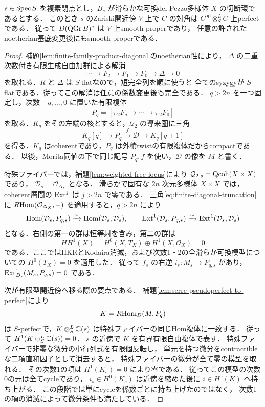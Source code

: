 \begin{theorem}[有限族のsmoothnessの有限開近傍]
\label{thm:finite-family-smooth-open}
$s\in\operatorname{Spec} S$ を複素閉点とし，$B_s$ が滑らかな可換del Pezzo多様体
$X$ の切断環であるとする．
このとき $s$ のZariski開近傍 $V$ 上で $C$ の対角は
$C^{\mathrm{op}}\otimes_S^LC$ 上perfectである．
従って $D(\operatorname{QGr} B)^c$ は $V$ 上smooth properであり，
任意の許されたnoetherian基底変更後にもsmooth properである．
\end{theorem}
\begin{proof}
補題\ref{lem:finite-family-product-diagonal}のnoetherian性により，
$\Delta$ の二重次数付き有限生成自由加群による解消
\[
 \cdots\longrightarrow F_2\longrightarrow F_1
 \longrightarrow F_0\longrightarrow\Delta\longrightarrow0
\]
を取れる．$R$ と $\Delta$ は $S$-flatなので，短完全列を順に使うと
全てのsyzygyが $S$-flatである．従ってこの解消は任意の係数変更後も完全である．
$q>2n$ を一つ固定し，次数 $-q,\ldots,0$ に置いた有限複体
\[
 P_q=[\pi_2F_q\longrightarrow\cdots\longrightarrow\pi_2F_0]
\]
を取る．$K_q$ をその左端の核とすると，$\mathcal Q_2$ の導来圏に三角
\begin{equation}
 K_q[q]\longrightarrow P_q\xrightarrow{f}\mathcal D
      \longrightarrow K_q[q+1]
 \label{eq:finite-diagonal-truncation}
\end{equation}
を得る．$K_q$ はcoherentであり，$P_q$ は外積twistの有限複体だからcompactである．
以後，Morita同値の下で同じ記号 $P_q,f$ を使い，$\mathcal D$ の像を $M$ と書く．

特殊ファイバーでは，補題\ref{lem:weighted-free-locus}により
$\mathcal Q_{2,s}=\operatorname{Qcoh}(X\times X)$ であり，
$\mathcal D_s=\mathcal O_{\Delta_X}$ となる．
滑らかで固有な $2n$ 次元多様体 $X\times X$ では，coherent層間の
$\operatorname{Ext}^j$ は $j>2n$ で零である．
三角\eqref{eq:finite-diagonal-truncation}に
$R\!\operatorname{Hom}(\mathcal O_{\Delta_X},-)$ を適用すると，$q>2n$ により
\[
 \operatorname{Hom}(\mathcal D_s,P_{q,s})\xrightarrow{\sim}
       \operatorname{Hom}(\mathcal D_s,\mathcal D_s),\qquad
 \operatorname{Ext}^1(\mathcal D_s,P_{q,s})\xrightarrow{\sim}
       \operatorname{Ext}^1(\mathcal D_s,\mathcal D_s)
\]
となる．右側の第一の群は恒等射を含み，第二の群は
\[
 HH^1(X)=H^0(X,T_X)\oplus H^1(X,\mathcal O_X)=0
\]
である．ここではHKRとKodaira消滅，および次数1・2の全滑らか可換模型についての
$H^0(T_X)=0$ \cite[補題8.7]{PoissonDP}を適用した．
従って $f_s$ の右逆 $i_s:M_s\to P_{q,s}$ があり，
$\operatorname{Ext}^1_{D_s}(M_s,P_{q,s})=0$ である．

次が有限型開近傍へ移る際の要点である．
補題\ref{lem:serre-pseudoperfect-to-perfect}により
\[
 K=R\!\operatorname{Hom}_D(M,P_q)
\]
は $S$-perfectで，$K\otimes_S^L\mathbb C(s)$ は特殊ファイバーの同じHom複体に一致する．
従って $H^1(K\otimes_S^L\mathbb C(s))=0$．
$s$ の近傍で $K$ を有界有限自由複体で表す．
特殊ファイバーで非零な微分の小行列式を有限個反転し，
単元を持つ微分をcontractibleな二項直和因子として消去すると，
特殊ファイバーの微分が全て零の模型を取れる．
その次数1の項は $H^1(K_s)=0$ により零である．
従ってこの模型の次数0の元は全てcycleであり，
$i_s\in H^0(K_s)$ は近傍を縮めた後に $i\in H^0(K)$ へ持ち上がる．
この段階では単にcycleを係数ごとに持ち上げたのではなく，
次数1の項の消滅によって微分条件も満たしている．


\end{proof}
